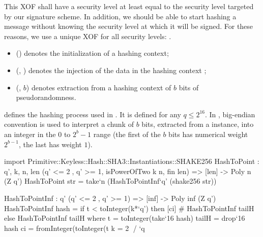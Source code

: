 This XOF shall have a security level at least equal to the security level targeted by our signature scheme. In addition, we should be able to start hashing a message without knowing the security level at which it will be signed. For these reasons, we use a unique XOF for all security levels: \shake.
\begin{itemize}
 \item \shakeinit() denotes the initialization of a \shake hashing context;
 \item \shakeinject(\shakectx, \str) denotes the injection of the data \str in the hashing context \shakectx;
 \item \shakeextract(\shakectx, $b$) denotes extraction from a hashing context \shakectx of $b$ bits of pseudorandomness.
\end{itemize}

\longhashtopoint defines the hashing process used in \falcon. It is defined for any $q \leq 2^{16}$. In \falcon, big-endian convention is used to interpret a chunk of $b$
bits, extracted from a \shake instance, into an integer in the $0$ to
$2^b-1$ range (the first of the $b$ bits has numerical weight $2^{b-1}$,
the last has weight $1$).

\begin{algorithm}[htb]
\caption{$\hashtopoint(\str, q, n)$}\label{alg:hashtopoint}
\begin{algorithmic}[1]
\State{$\shakectx \gets \shakeinit()$}
\State{$\shakeinject(\shakectx, \str)$}
\label{step:extract}
 \label{alg:hashtopoint:cmp}\label{step:check}
 \label{alg:hashtopoint:mod}
\EndIf
\EndWhile
{}
\end{algorithmic}
\end{algorithm}

\begin{code}
  import Primitive::Keyless::Hash::SHA3::Instantiations::SHAKE256
  HashToPoint : {q', k, n, len}
    (q' <= 2^^16, q' >= 1, isPowerOfTwo k n, fin len) =>
    [len] -> Poly n (Z q')
  HashToPoint str = take`{n} (HashToPointInf`{q'} (shake256 str))

  HashToPointInf : {q'} (q' <= 2^^16, q' >= 1) =>
    [inf] -> Poly inf (Z q')
  HashToPointInf hash =
    if t < toInteger(k*`q') then
      [ci] # HashToPointInf tailH
    else
      HashToPointInf tailH
    where
      t = toInteger(take`{16} hash)
      tailH = drop`{16} hash
      ci = fromInteger(toInteger(t%
      k = 2^^16 / `q
\end{code}

